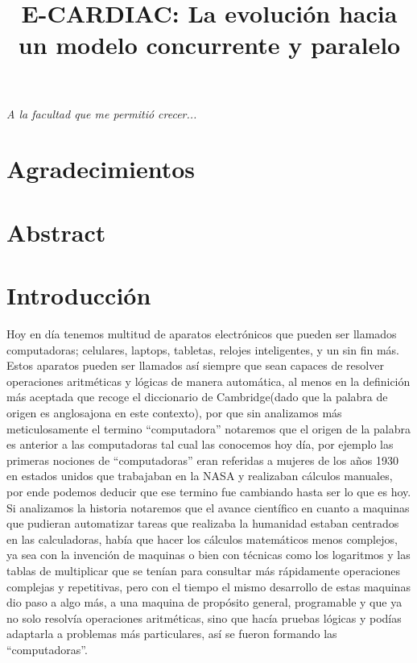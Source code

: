 \documentclass[letterpaper,12pt,oneside]{book}
\title{E-CARDIAC: La evolución hacia un modelo concurrente y paralelo}
\begin{document}
	\frontmatter

    

\chapter*{}
\begin{flushright}%
  \emph{A la facultad que me permitió crecer...}
  \thispagestyle{empty}
\end{flushright}

\chapter{Agradecimientos}

\chapter{Abstract}

\chapter{Introducción}

	Hoy en día tenemos multitud de aparatos electrónicos que pueden ser llamados computadoras; celulares, laptops, tabletas, relojes inteligentes, y un sin fin más. 
	Estos aparatos pueden ser llamados así siempre que sean  capaces de resolver operaciones aritméticas y lógicas de manera automática, al menos en la definición
	más aceptada que recoge el diccionario de Cambridge(dado que la palabra de origen es anglosajona en este contexto),
	por que sin analizamos más meticulosamente el termino ``computadora''  notaremos que el origen de la palabra es anterior a las computadoras
	tal cual las conocemos hoy día, por ejemplo las primeras nociones de ``computadoras''  eran referidas a mujeres de los años 1930 en estados unidos
	que trabajaban en la NASA y realizaban cálculos manuales, por ende podemos deducir que ese termino fue cambiando hasta ser lo que es hoy.
	Si analizamos la historia notaremos que el avance científico en cuanto a maquinas
	que pudieran automatizar tareas que realizaba la humanidad estaban centrados en las calculadoras, había que hacer los cálculos matemáticos menos
	complejos, ya sea con la invención de maquinas o bien con técnicas como los logaritmos y las tablas de multiplicar que se tenían
	para consultar más rápidamente operaciones complejas y repetitivas, pero con el tiempo el mismo desarrollo de estas maquinas dio paso a algo más,
	a una maquina de propósito general, programable y que ya no solo resolvía operaciones aritméticas, sino que hacía pruebas lógicas y podías
	adaptarla a problemas más particulares, así se fueron formando las ``computadoras''.
	
\end{document}
